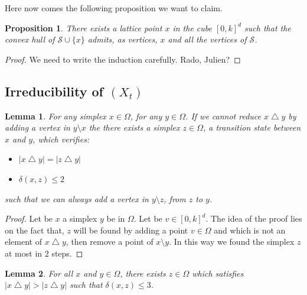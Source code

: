 \documentclass[a4paper]{article}
\newtheorem{proposition}{Proposition}[subsection]
\newtheorem{lemma}{Lemma}[subsection]
\renewcommand{\S}{\mathcal{S}}
\begin{document}
Here now comes the following proposition we want to claim.

\begin{proposition}\label{prop.A}
There exists a lattice point $x$ in the cube $[0,k]^d$ such that the convex hull of $\S\cup\{x\}$ admits, as vertices, $x$ and all the vertices of $\S$.
\end{proposition}

\begin{proof}
We need to write the induction carefully. Rado, Julien?
\end{proof}

\subsection{Irreducibility of $(X_t)$}


\begin{lemma}\label{lem:elim-mauvais-cas}
  For any simplex $x \in \Omega$, for any $y \in \Omega$. If we cannot reduce $x \bigtriangleup y$ by adding a vertex in $y \setminus x$ the there exists a simplex $z \in \Omega$, a transition state between $x$ and $y$, which verifies:
  \begin{itemize}
    \item $|x \bigtriangleup y| = |z \bigtriangleup y|$
    \item $\delta(x,z)\leq{2}$
  \end{itemize}
  such that we can always add a vertex in $y \setminus z$, from $z$ to $y$.
\end{lemma}

\begin{proof}
Let be $x$ a simplex $y$ be in $\Omega$. Let be $v \in [0,k]^d$. The idea of the proof lies on the fact that, $z$ will be found by adding a point $v \in \Omega$ and which is not an element of $x \bigtriangleup y$, then remove a point of $x \setminus y$. In this way we found the simplex $z$ at most in 2 steps.
\end{proof}

\begin{lemma}\label{lem:irreducibility}
  For all $x$ and $y \in \Omega$, there exists $z \in \Omega$ which satisfies $|x \bigtriangleup y| > |z \bigtriangleup y|$ such that $\delta(x,z)\leq{3}$.
\end{lemma}
\end{document}
